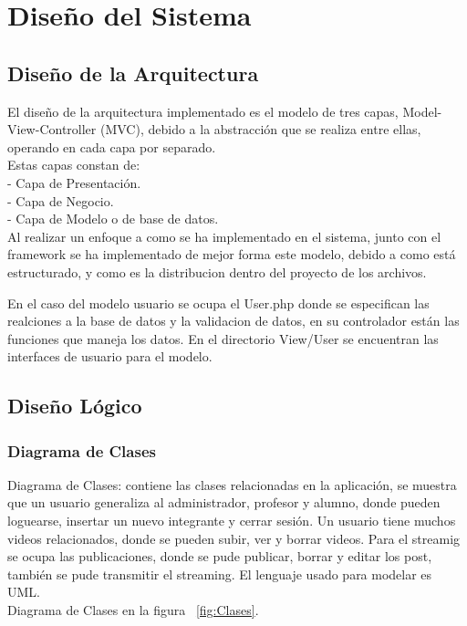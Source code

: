 \documentclass[12pt]{article}
\begin{document}
\newpage
\section{Dise\~no del Sistema}
\subsection{Dise\~no de la Arquitectura}
El dise\~no de la arquitectura implementado es el modelo de tres capas, Model-View-Controller (MVC), debido a la abstracción que se realiza entre ellas, operando en cada capa por separado.\\
Estas capas constan de:\\
-	Capa de Presentación.\\
-	Capa de Negocio.\\
-	Capa de Modelo o de base de datos.\\

Al realizar un enfoque a como se ha implementado en el sistema, junto con el framework se ha implementado de mejor 
forma este modelo, debido a como está estructurado, y como es la distribucion dentro del proyecto de los archivos.

En el caso del modelo usuario se ocupa el User.php donde se especifican las realciones a la base de datos y la 
validacion de datos, en su controlador están las funciones que maneja los datos. En el directorio View/User se 
encuentran las interfaces de usuario para el modelo.\\

\subsection{Dise\~no Lógico}
\subsubsection{Diagrama de Clases}
Diagrama de Clases: contiene las clases relacionadas en la aplicación, se muestra que un usuario generaliza al 
administrador, profesor y alumno, donde pueden loguearse, insertar un nuevo integrante y cerrar sesión. 
Un usuario tiene muchos videos relacionados, donde se pueden subir, ver y borrar videos. Para el streamig se 
ocupa las publicaciones, donde se pude publicar, borrar y editar los post, también se pude transmitir el 
streaming. El lenguaje usado para modelar es UML. \\

Diagrama de Clases en la figura ~\ref{fig:Clases}.
\end{document}
